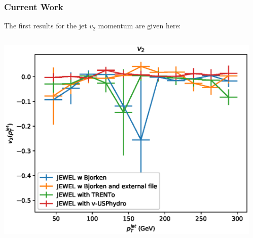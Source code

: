 \documentclass{beamer}
\begin{document}
\begin{frame}\frametitle{Current Work}
	\begin{minipage}{1\textwidth}
	The first results for the jet $v_2$ momentum are given here:
    \end{minipage}
    \begin{columns}
    \begin{column}{0.5\textwidth}
	\begin{minipage}[l]{0.5\textwidth}
	\includegraphics[scale=0.4]{images/v2.eps}
	\end{minipage}
	\end{column}
    \begin{column}{0.4\textwidth}
	\begin{minipage}[r]{1\textwidth}
	
	\end{minipage}
	\end{column}
	\end{columns}
\end{frame}
\end{document}
